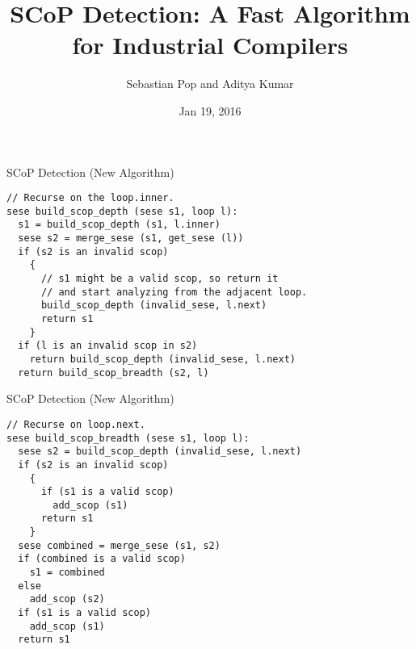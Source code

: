\documentclass{beamer}
\begin{document}
\def \SCoP {SCoP}
\def \GCC {GCC}
\def \LLVM {LLVM}
\def \SESE {SESE}
\def \CFG {CFG}
\def \SSA {SSA}
\def \scev {scev}

\title{\SCoP{} Detection: A Fast Algorithm for Industrial Compilers}
\author{Sebastian Pop and Aditya Kumar}
\date{Jan 19, 2016}

\frame{\titlepage}



\begin{frame}[fragile]{SCoP Detection (New Algorithm) }
\begin{verbatim}
// Recurse on the loop.inner.
sese build_scop_depth (sese s1, loop l):
  s1 = build_scop_depth (s1, l.inner)
  sese s2 = merge_sese (s1, get_sese (l))
  if (s2 is an invalid scop)
    {
      // s1 might be a valid scop, so return it
      // and start analyzing from the adjacent loop.
      build_scop_depth (invalid_sese, l.next)
      return s1
    }
  if (l is an invalid scop in s2)
    return build_scop_depth (invalid_sese, l.next)
  return build_scop_breadth (s2, l)

\end{verbatim}
\end{frame}

\begin{frame}[fragile]{SCoP Detection (New Algorithm) }
\begin{verbatim}
// Recurse on loop.next.
sese build_scop_breadth (sese s1, loop l):
  sese s2 = build_scop_depth (invalid_sese, l.next)
  if (s2 is an invalid scop)
    {
      if (s1 is a valid scop)
        add_scop (s1)
      return s1
    }
  sese combined = merge_sese (s1, s2)
  if (combined is a valid scop)
    s1 = combined
  else
    add_scop (s2)
  if (s1 is a valid scop)
    add_scop (s1)
  return s1
\end{verbatim}
\end{frame}
\end{document}
